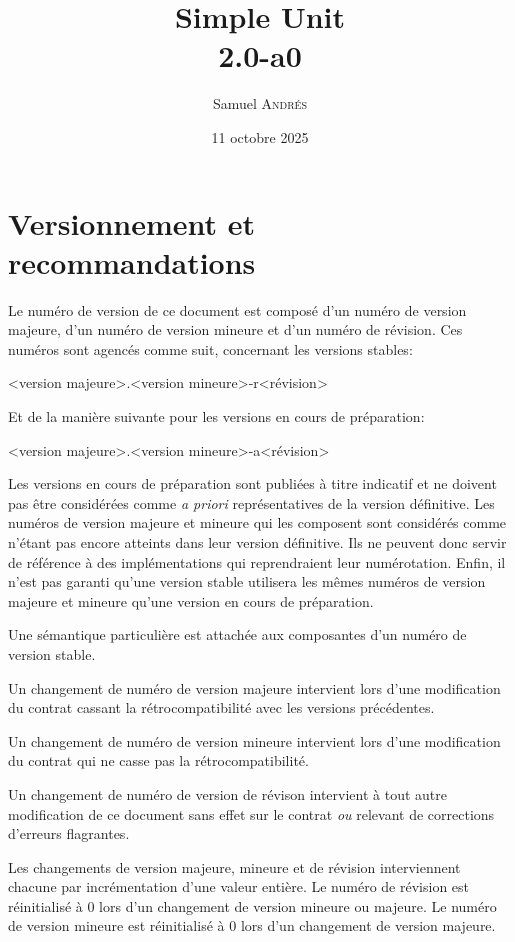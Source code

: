 \documentclass[a4paper,twoside,10pt]{article}
\title{Simple Unit\\2.0-a0}
\author{Samuel \textsc{Andrés}}
\date{11 octobre 2025}
\begin{document}
\maketitle

\tableofcontents

\section{Versionnement et recommandations}

Le numéro de version de ce document est composé d'un numéro de version majeure, d'un numéro de version mineure et d'un
numéro de révision. Ces numéros sont agencés comme suit, concernant les versions stables:

<version majeure>.<version mineure>-r<révision>

Et de la manière suivante pour les versions en cours de préparation:

<version majeure>.<version mineure>-a<révision>

Les versions en cours de préparation sont publiées à titre indicatif et ne doivent pas être considérées comme
\emph{a priori} représentatives de la version définitive. Les numéros de version majeure et mineure qui les composent
sont considérés comme n'étant pas encore atteints dans leur version définitive. Ils ne peuvent donc servir de
référence à des implémentations qui reprendraient leur numérotation. Enfin, il n'est pas garanti qu'une version stable
utilisera les mêmes numéros de version majeure et mineure qu'une version en cours de préparation.

Une sémantique particulière est attachée aux composantes d'un numéro de version stable.

Un changement de numéro de version majeure intervient lors d'une modification du contrat cassant la rétrocompatibilité
avec les versions précédentes.

Un changement de numéro de version mineure intervient lors d'une modification du contrat qui ne casse pas la
rétrocompatibilité.

Un changement de numéro de version de révison intervient à tout autre modification de ce document sans effet sur le
contrat \emph{ou} relevant de corrections d'erreurs flagrantes.

Les changements de version majeure, mineure et de révision interviennent chacune par incrémentation d'une valeur
entière. Le numéro de révision est réinitialisé à 0 lors d'un changement de version mineure ou majeure. Le numéro de
version mineure est réinitialisé à 0 lors d'un changement de version majeure.
\end{document}
